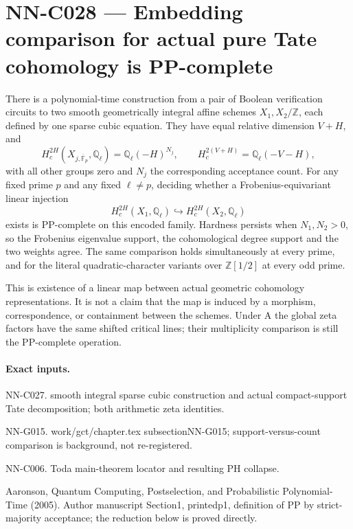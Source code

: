 \section{NN-C028 --- Embedding comparison for actual pure Tate cohomology is PP-complete}
\begin{proposition}[NN-C028]
There is a polynomial-time construction from a pair of Boolean verification circuits to two smooth geometrically integral affine schemes $X_1,X_2/\mathbb Z$, each defined by one sparse cubic equation. They have equal relative dimension $V+H$, and
\[
 H_c^{2H}(X_{j,\overline{\mathbb F}_p},\mathbb Q_\ell)
          =\mathbb Q_\ell(-H)^{N_j},\qquad
 H_c^{2(V+H)}=\mathbb Q_\ell(-V-H),
\]
with all other groups zero and $N_j$ the corresponding acceptance count. For any fixed prime $p$ and any fixed $\ell\ne p$, deciding whether a Frobenius-equivariant linear injection
\[
 H_c^{2H}(X_1,\mathbb Q_\ell)
       \hookrightarrow H_c^{2H}(X_2,\mathbb Q_\ell)
\]
exists is PP-complete on this encoded family. Hardness persists when $N_1,N_2>0$, so the Frobenius eigenvalue support, the cohomological degree support and the two weights agree. The same comparison holds simultaneously at every prime, and for the literal quadratic-character variants over $\mathbb Z[1/2]$ at every odd prime.

This is existence of a linear map between actual geometric cohomology representations. It is not a claim that the map is induced by a morphism, correspondence, or containment between the schemes. Under A the global zeta factors have the same shifted critical lines; their multiplicity comparison is still the PP-complete operation.
\end{proposition}
\paragraph{Exact inputs.}
NN-C027. smooth integral sparse cubic construction and actual compact-support Tate decomposition; both arithmetic zeta identities.

NN-G015. work/gct/chapter.tex subsectionNN-G015; support-versus-count comparison is background, not re-registered.

NN-C006. Toda main-theorem locator and resulting PH collapse.

Aaronson, Quantum Computing, Postselection, and Probabilistic Polynomial-Time (2005). Author manuscript Section1, printedp1, definition of PP by strict-majority acceptance; the reduction below is proved directly.

